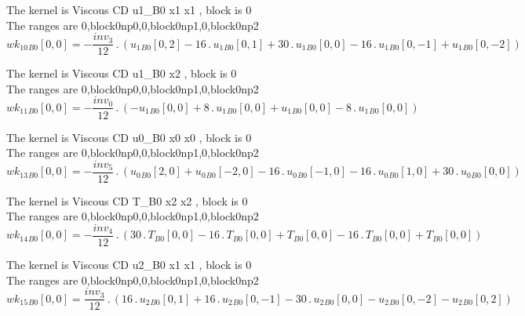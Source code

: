 \documentclass{article}
\begin{document}
\noindent The kernel is Viscous CD u1_B0 x1 x1 , block is 0\\\noindent The ranges are 0,block0np0,0,block0np1,0,block0np2\\\begin{dmath}{wk_{10}{_{B0}}}[{0,0}] = - \frac{inv_3}{12} \,.\, \left({u_{1}{_{B0}}}[{0,2}] - 16 \,.\, {u_{1}{_{B0}}}[{0,1}] + 30 \,.\, {u_{1}{_{B0}}}[{0,0}] - 16 \,.\, {u_{1}{_{B0}}}[{0,-1}] + {u_{1}{_{B0}}}[{0,-2}]\right)\end{dmath}

\noindent The kernel is Viscous CD u1_B0 x2 , block is 0\\\noindent The ranges are 0,block0np0,0,block0np1,0,block0np2\\\begin{dmath}{wk_{11}{_{B0}}}[{0,0}] = - \frac{inv_0}{12} \,.\, \left(- {u_{1}{_{B0}}}[{0,0}] + 8 \,.\, {u_{1}{_{B0}}}[{0,0}] + {u_{1}{_{B0}}}[{0,0}] - 8 \,.\, {u_{1}{_{B0}}}[{0,0}]\right)\end{dmath}

\noindent The kernel is Viscous CD u0_B0 x0 x0 , block is 0\\\noindent The ranges are 0,block0np0,0,block0np1,0,block0np2\\\begin{dmath}{wk_{13}{_{B0}}}[{0,0}] = - \frac{inv_5}{12} \,.\, \left({u_{0}{_{B0}}}[{2,0}] + {u_{0}{_{B0}}}[{-2,0}] - 16 \,.\, {u_{0}{_{B0}}}[{-1,0}] - 16 \,.\, {u_{0}{_{B0}}}[{1,0}] + 30 \,.\, {u_{0}{_{B0}}}[{0,0}]\right)\end{dmath}

\noindent The kernel is Viscous CD T_B0 x2 x2 , block is 0\\\noindent The ranges are 0,block0np0,0,block0np1,0,block0np2\\\begin{dmath}{wk_{14}{_{B0}}}[{0,0}] = - \frac{inv_4}{12} \,.\, \left(30 \,.\, {T{_{B0}}}[{0,0}] - 16 \,.\, {T{_{B0}}}[{0,0}] + {T{_{B0}}}[{0,0}] - 16 \,.\, {T{_{B0}}}[{0,0}] + {T{_{B0}}}[{0,0}]\right)\end{dmath}

\noindent The kernel is Viscous CD u2_B0 x1 x1 , block is 0\\\noindent The ranges are 0,block0np0,0,block0np1,0,block0np2\\\begin{dmath}{wk_{15}{_{B0}}}[{0,0}] = \frac{inv_3}{12} \,.\, \left(16 \,.\, {u_{2}{_{B0}}}[{0,1}] + 16 \,.\, {u_{2}{_{B0}}}[{0,-1}] - 30 \,.\, {u_{2}{_{B0}}}[{0,0}] - {u_{2}{_{B0}}}[{0,-2}] - {u_{2}{_{B0}}}[{0,2}]\right)\end{dmath}
\end{document}
